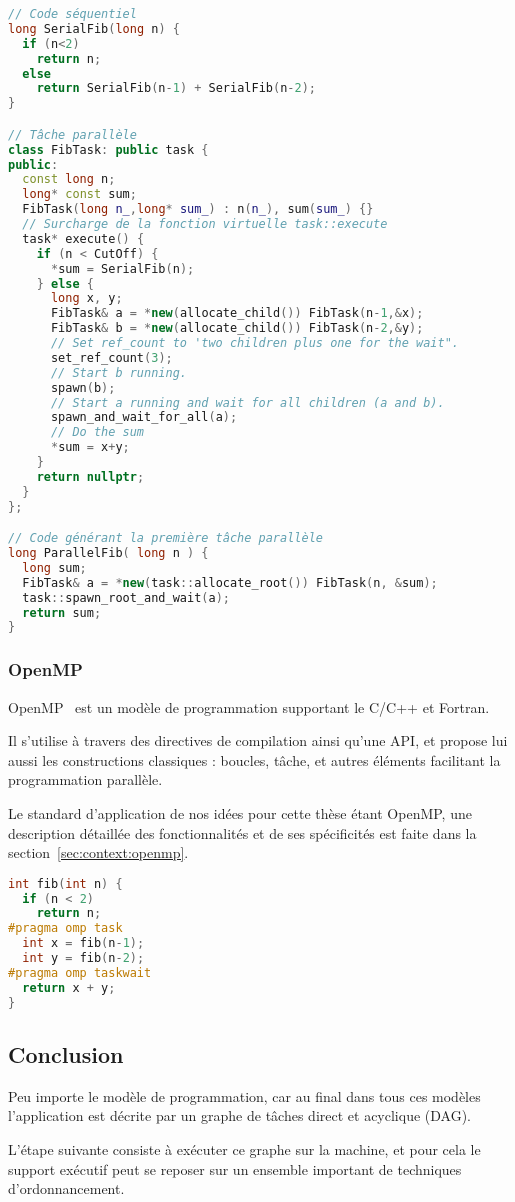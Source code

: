 \begin{lstlisting}[language=c++,caption=Fibonacci exprimé en TBB,label=lst:context:tbb,basicstyle=\scriptsize]
// Code séquentiel
long SerialFib(long n) {
  if (n<2)
    return n;
  else
    return SerialFib(n-1) + SerialFib(n-2);
}

// Tâche parallèle
class FibTask: public task {
public:
  const long n;
  long* const sum;
  FibTask(long n_,long* sum_) : n(n_), sum(sum_) {}
  // Surcharge de la fonction virtuelle task::execute
  task* execute() {
    if (n < CutOff) {
      *sum = SerialFib(n);
    } else {
      long x, y;
      FibTask& a = *new(allocate_child()) FibTask(n-1,&x);
      FibTask& b = *new(allocate_child()) FibTask(n-2,&y);
      // Set ref_count to 'two children plus one for the wait".
      set_ref_count(3);
      // Start b running.
      spawn(b);
      // Start a running and wait for all children (a and b).
      spawn_and_wait_for_all(a);
      // Do the sum
      *sum = x+y;
    }
    return nullptr;
  }
};

// Code générant la première tâche parallèle
long ParallelFib( long n ) {
  long sum;
  FibTask& a = *new(task::allocate_root()) FibTask(n, &sum);
  task::spawn_root_and_wait(a);
  return sum;
}
\end{lstlisting}

\subsubsection{OpenMP}

OpenMP~\cite{openmp45} est un modèle de programmation supportant le C/C++ et Fortran.

Il s'utilise à travers des directives de compilation ainsi qu'une API, et propose lui aussi les constructions classiques : boucles, tâche, et autres éléments facilitant la programmation parallèle.

Le standard d'application de nos idées pour cette thèse étant OpenMP, une description détaillée des fonctionnalités et de ses spécificités est faite dans la section~\ref{sec:context:openmp}.

\begin{lstlisting}[language=c++,caption=Fibonacci exprimé en OpenMP,label=lst:context:openmp,basicstyle=\scriptsize]
int fib(int n) {
  if (n < 2)
    return n;
#pragma omp task
  int x = fib(n-1);
  int y = fib(n-2);
#pragma omp taskwait
  return x + y;
}
\end{lstlisting}

\subsection*{Conclusion}

Peu importe le modèle de programmation, car au final dans tous ces modèles l'application est décrite par un graphe de tâches direct et acyclique (DAG).

L'étape suivante consiste à exécuter ce graphe sur la machine, et pour cela le support exécutif peut se reposer sur un ensemble important de techniques d'ordonnancement. 


